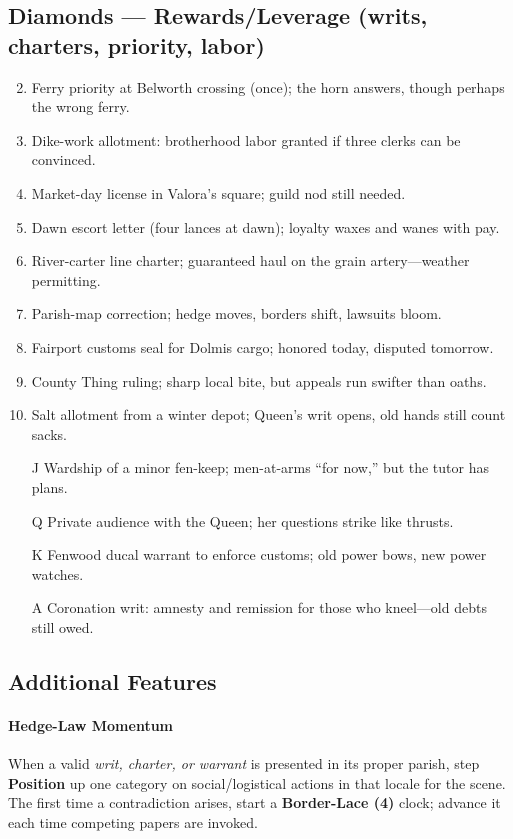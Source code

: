 \subsection*{Diamonds --- Rewards/Leverage (writs, charters, priority, labor)}
\label{sec:viterra-rewards}
\begin{enumerate}
\setcounter{enumi}{1}
\item Ferry priority at Belworth crossing (once); the horn answers, though perhaps the wrong ferry.
\item Dike-work allotment: brotherhood labor granted if three clerks can be convinced.
\item Market-day license in Valora’s square; guild nod still needed.
\item Dawn escort letter (four lances at dawn); loyalty waxes and wanes with pay.
\item River-carter line charter; guaranteed haul on the grain artery—weather permitting.
\item Parish-map correction; hedge moves, borders shift, lawsuits bloom.
\item Fairport customs seal for Dolmis cargo; honored today, disputed tomorrow.
\item County Thing ruling; sharp local bite, but appeals run swifter than oaths.
\item Salt allotment from a winter depot; Queen’s writ opens, old hands still count sacks.
\item[J] Wardship of a minor fen-keep; men-at-arms “for now,” but the tutor has plans.
\item[Q] Private audience with the Queen; her questions strike like thrusts.
\item[K] Fenwood ducal warrant to enforce customs; old power bows, new power watches.
\item[A] Coronation writ: amnesty and remission for those who kneel—old debts still owed.
\end{enumerate}

\subsection*{Additional Features}
\label{sec:viterra-features}
\paragraph{Hedge-Law Momentum}
When a valid \emph{writ, charter, or warrant} is presented in its proper parish, step \textbf{Position} up one category on social/logistical actions in that locale for the scene. The first time a contradiction arises, start a \textbf{Border-Lace (4)} clock; advance it each time competing papers are invoked.

